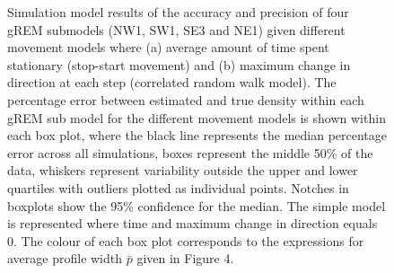 \begin{knitrout}\footnotesize
{}\color{fgcolor}\begin{figure}[t]

{\centering {}

}

\caption[Simulation model results of the accuracy and precision of four gREM submodels]{
Simulation model results of the accuracy and precision of four gREM submodels (NW1, SW1, SE3 and NE1) given different movement models where (a) average amount of time spent stationary (stop-start movement) and (b) maximum change in direction at each step (correlated random walk model).
The percentage error between estimated and true density within each gREM sub model for the different movement models is shown within each box plot, where the black line represents the median percentage error across all simulations, boxes represent the middle 50\% of the data, whiskers represent variability outside the upper and lower quartiles with outliers plotted as individual points.
Notches in boxplots show the 95\% confidence for the median.
The simple model is represented where time and maximum change in direction equals 0.
The colour of each box plot corresponds to the expressions for average profile width $\bar{p}$ given in Figure 4.
}\label{fig:movtFig}
\end{figure}


\end{knitrout}

